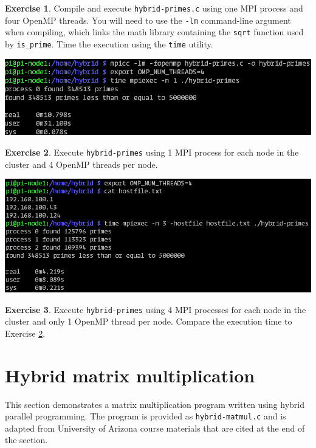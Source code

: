 \documentclass{article}
\theoremstyle{definition}
\newtheorem{exercise}{Exercise}
\begin{document}
\begin{exercise}
Compile and execute \texttt{hybrid-primes.c} using one MPI process and four OpenMP threads. You will need to use the \texttt{-lm} command-line argument when compiling, which links the math library containing the \texttt{sqrt} function used by \texttt{is\_prime}. Time the execution using the \texttt{time} utility.

\includegraphics[width=\textwidth]{images/hybrid-primes-output-1.png}
\end{exercise}

\begin{exercise}
\label{ex:primes-2}
Execute \texttt{hybrid-primes} using 1 MPI process for each node in the cluster and 4 OpenMP threads per node.

\includegraphics[width=\textwidth]{images/hybrid-primes-output-2.png}
\end{exercise}

\begin{exercise}
Execute \texttt{hybrid-primes} using 4 MPI processes for each node in the cluster and only 1 OpenMP thread per node. Compare the execution time to Exercise \ref{ex:primes-2}.
\end{exercise}

\section{Hybrid matrix multiplication}

This section demonstrates a matrix multiplication program written using hybrid parallel programming. The program is provided as \texttt{hybrid-matmul.c} and is adapted from University of Arizona course materials that are cited at the end of the section.
\end{document}
